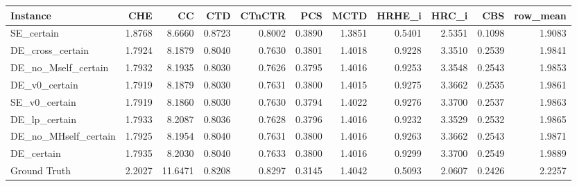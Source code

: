 \begin{tabular}{lrrrrrrrrrr}
\toprule
Instance & CHE & CC & CTD & CTnCTR & PCS & MCTD & HRHE_i & HRC_i & CBS & row_mean \\
\midrule
SE_certain & 1.8768 & 8.6660 & 0.8723 & 0.8002 & 0.3890 & 1.3851 & 0.5401 & 2.5351 & 0.1098 & 1.9083 \\
DE_cross_certain & 1.7924 & 8.1879 & 0.8040 & 0.7630 & 0.3801 & 1.4018 & 0.9228 & 3.3510 & 0.2539 & 1.9841 \\
DE_no_Mself_certain & 1.7932 & 8.1935 & 0.8030 & 0.7626 & 0.3795 & 1.4016 & 0.9253 & 3.3548 & 0.2543 & 1.9853 \\
DE_v0_certain & 1.7919 & 8.1879 & 0.8030 & 0.7631 & 0.3800 & 1.4015 & 0.9275 & 3.3662 & 0.2535 & 1.9861 \\
SE_v0_certain & 1.7919 & 8.1860 & 0.8030 & 0.7630 & 0.3794 & 1.4022 & 0.9276 & 3.3700 & 0.2537 & 1.9863 \\
DE_lp_certain & 1.7933 & 8.2087 & 0.8036 & 0.7628 & 0.3796 & 1.4016 & 0.9232 & 3.3529 & 0.2532 & 1.9865 \\
DE_no_MHself_certain & 1.7925 & 8.1954 & 0.8040 & 0.7631 & 0.3800 & 1.4016 & 0.9263 & 3.3662 & 0.2543 & 1.9871 \\
DE_certain & 1.7935 & 8.2030 & 0.8040 & 0.7633 & 0.3800 & 1.4016 & 0.9299 & 3.3700 & 0.2549 & 1.9889 \\
Ground Truth & 2.2027 & 11.6471 & 0.8208 & 0.8297 & 0.3145 & 1.4042 & 0.5093 & 2.0607 & 0.2426 & 2.2257 \\
\bottomrule
\end{tabular}
